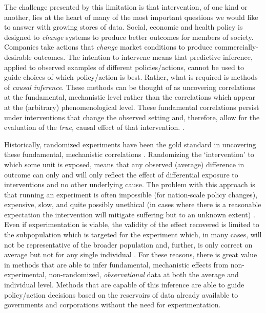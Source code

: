 \documentclass[../main.tex]{subfiles}
\begin{document}
\vspace{\baselineskip}
The challenge presented by this limitation is that intervention, of one kind or another, lies at the heart of many of the most important questions we would like to answer with growing stores of data. Social, economic and health policy is designed to \textit{change} systems to produce better outcomes for members of society. Companies take actions that \textit{change} market conditions to produce commercially-desirable outcomes. The intention to intervene means that predictive inference, applied to observed examples of different policies/actions, cannot be used to guide choices of which policy/action is best. Rather, what is required is methods of \textit{causal inference}. These methods can be thought of as uncovering correlations at the fundamental, mechanistic level rather than the correlations which appear at the (arbitrary) phenomenological level. These fundamental correlations persist under interventions that change the observed setting and, therefore, allow for the evaluation of the \textit{true, }causal\textit{ }effect of that intervention. \cite{Scholkopf2019CausalityLearning}.\par


\vspace{\baselineskip}
Historically, randomized experiments have been the gold standard in uncovering these fundamental, mechanistic correlations \cite{Meldrum2000AStandard}. Randomizing the ‘intervention’ to which some unit is exposed, means that any observed (average) difference in outcome can only and will only reflect the effect of differential exposure to interventions and no other underlying cause. The problem with this approach is that running an experiment is often impossible (for nation-scale policy changes), expensive, slow, and quite possibly unethical (in cases where there is a reasonable expectation the intervention will mitigate suffering but to an unknown extent) \cite{Meldrum2000AStandard}. Even if experimentation is viable, the validity of the effect recovered is limited to the subpopulation which is targeted for the experiment which, in many cases, will not be representative of the broader population and, further, is only correct on average but not for any single individual \cite{Rothwell2006FactorsTrials}. For these reasons, there is great value in methods that are able to infer fundamental, mechanistic effects from non-experimental, non-randomized, \textit{observational} data at both the average and individual level. Methods that are capable of this inference are able to guide policy/action decisions based on the reservoirs of data already available to governments and corporations without the need for experimentation.\par
\end{document}
